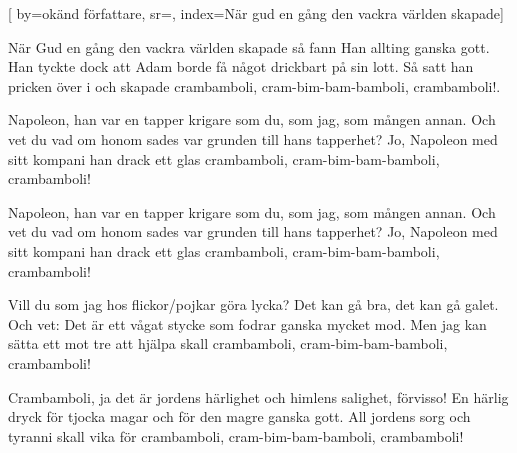 

[ 		%
	by={okänd författare},					%
	sr={},					%
	index={När gud en gång den vackra världen skapade}]						%



\beginverse*						%
När Gud en gång den vackra världen skapade
så fann Han allting ganska gott.
Han tyckte dock att Adam borde
få något drickbart på sin lott.
Så satt han pricken över i
och skapade crambamboli,
cram-bim-bam-bamboli,
crambamboli!.
\endverse							%

\beginverse*						%
Napoleon, han var en tapper krigare
som du, som jag, som mången annan.
Och vet du vad om honom sades
var grunden till hans tapperhet?
Jo, Napoleon med sitt kompani
han drack ett glas crambamboli,
cram-bim-bam-bamboli,
crambamboli!
\endverse							%

\beginverse*						%
Napoleon, han var en tapper krigare
som du, som jag, som mången annan.
Och vet du vad om honom sades
var grunden till hans tapperhet?
Jo, Napoleon med sitt kompani
han drack ett glas crambamboli,
cram-bim-bam-bamboli,
crambamboli!
\endverse							%


\beginverse*						%
Vill du som jag hos flickor/pojkar göra lycka?
Det kan gå bra, det kan gå galet.
Och vet: Det är ett vågat stycke
som fodrar ganska mycket mod.
Men jag kan sätta ett mot tre
att hjälpa skall crambamboli,
cram-bim-bam-bamboli,
crambamboli!
\endverse							%


\beginverse*						%
Crambamboli, ja det är jordens härlighet
och himlens salighet, förvisso!
En härlig dryck för tjocka magar
och för den magre ganska gott.
All jordens sorg och tyranni
skall vika för crambamboli,
cram-bim-bam-bamboli,
crambamboli!
\endverse							%



\endsong							%